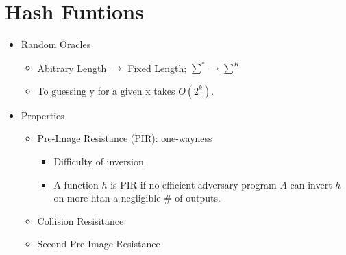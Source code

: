 \section{Hash Funtions}
\begin{itemize}
\item Random Oracles
    \begin{itemize}
    \item Abitrary Length $\rightarrow$ Fixed Length; $\sum^* \rightarrow \sum^K$
    \item To guessing y for a given x takes $O(2^k)$.
    \end{itemize}
\item Properties
    \begin{itemize}
    \item Pre-Image Resistance (PIR): one-wayness
        \begin{itemize}
        \item Difficulty of inversion
        \item A function $h$ is PIR if no efficient adversary program $A$ can invert $h$ on more htan a negligible # of outputs.
        \end{itemize}
    \item Collision Resisitance
    \item Second Pre-Image Resistance
    \end{itemize}
\end{itemize}
